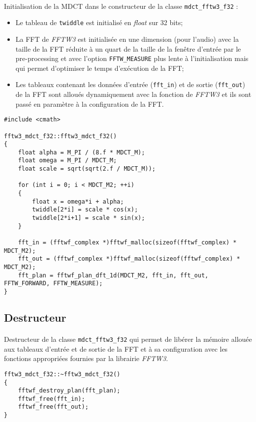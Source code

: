 \documentclass{article}
\begin{document}
\paragraph{}
Initialisation de la MDCT dans le constructeur de la classe \texttt{mdct\_fftw3\_f32} :
\begin{itemize}
    \item Le tableau de \texttt{twiddle} est initialisé en \emph{float} sur 32 bits;
    \item La FFT de \emph{FFTW3} est initialisée en une dimension (pour l'audio) avec la taille de la FFT réduite à un quart de la taille de la fenêtre d'entrée par le pre-processing et avec l'option \texttt{FFTW\_MEASURE} plus lente à l'initialisation mais qui permet d'optimiser le temps d'exécution de la FFT;
    \item Les tableaux contenant les données d'entrée (\texttt{fft\_in}) et de sortie (\texttt{fft\_out}) de la FFT sont alloués dynamiquement avec la fonction de \emph{FFTW3} et ils sont passé en paramètre à la configuration de la FFT.
\end{itemize}
\lstset{language=C++}
\begin{lstlisting}
#include <cmath>

fftw3_mdct_f32::fftw3_mdct_f32()
{
    float alpha = M_PI / (8.f * MDCT_M);
    float omega = M_PI / MDCT_M;
    float scale = sqrt(sqrt(2.f / MDCT_M));

    for (int i = 0; i < MDCT_M2; ++i)
    {
        float x = omega*i + alpha;
        twiddle[2*i] = scale * cos(x);
        twiddle[2*i+1] = scale * sin(x);
    }

    fft_in = (fftwf_complex *)fftwf_malloc(sizeof(fftwf_complex) * MDCT_M2);
    fft_out = (fftwf_complex *)fftwf_malloc(sizeof(fftwf_complex) * MDCT_M2);
    fft_plan = fftwf_plan_dft_1d(MDCT_M2, fft_in, fft_out, FFTW_FORWARD, FFTW_MEASURE);
}
\end{lstlisting}

\subsection{Destructeur}\label{app:mdct_fftw3_f32_destructor}
\paragraph{}
Destructeur de la classe \texttt{mdct\_fftw3\_f32} qui permet de libérer la mémoire allouée aux tableaux d'entrée et de sortie de la FFT et à sa configuration avec les fonctions appropriées fournies par la librairie \emph{FFTW3}.
\lstset{language=C++}
\begin{lstlisting}
fftw3_mdct_f32::~fftw3_mdct_f32()
{
    fftwf_destroy_plan(fft_plan);
    fftwf_free(fft_in);
    fftwf_free(fft_out);
}
\end{lstlisting}
\end{document}
